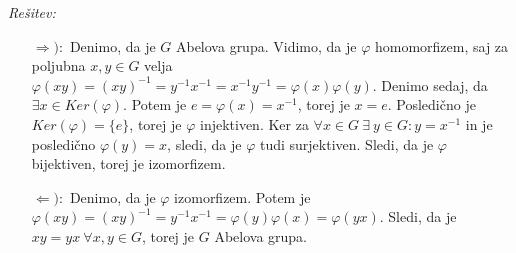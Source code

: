 \documentclass[a4paper, 10pt]{article}
\newenvironment{resitev}{\begin{flushleft}\textit{Rešitev:}}{\hfill\end{flushleft}}
\begin{document}
	\begin{resitev}
		\begin{itemize}
			\item[$\Rightarrow):$] Denimo, da je $G$ Abelova grupa. Vidimo, da je $\varphi$ homomorfizem, saj za poljubna $x, y\in G$ velja $\varphi(xy) = (xy)^{-1} = y^{-1}x^{-1} = x^{-1}y^{-1} = \varphi(x)\varphi(y)$.
			Denimo sedaj, da $\exists x\in Ker(\varphi)$. Potem je $e = \varphi(x) = x^{-1}$, torej je $x = e$. Posledično je $Ker(\varphi) = \{e\}$, torej je $\varphi$ injektiven.
			Ker za $\forall x\in G ~\exists~ y\in G: y = x^{-1}$ in je posledično $\varphi(y) = x$, sledi, da je $\varphi$ tudi surjektiven. Sledi, da je $\varphi$ bijektiven, torej je izomorfizem.
			\item[$\Leftarrow):$] Denimo, da je $\varphi$ izomorfizem. Potem je $\varphi(xy) = (xy)^{-1} = y^{-1}x^{-1} = \varphi(y)\varphi(x)=\varphi(yx)$. Sledi, da je $xy = yx~\forall x,y \in G$, torej je $G$ Abelova grupa.
		\end{itemize}
	\end{resitev}
\end{document}
